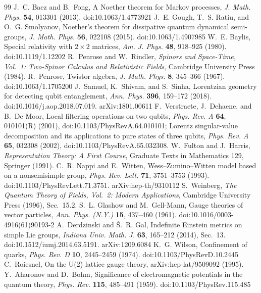 \documentclass[10pt]{article}
\begin{document}
\begin{thebibliography}{99}
 J.~C. Baez and B.~Fong, A Noether theorem for Markov processes, \textit{J. Math. Phys.} \textbf{54}, 013301 (2013). doi:10.1063/1.4773921
 J.~E. Gough, T.~S. Ratiu, and O.~G. Smolyanov, Noether's theorem for dissipative quantum dynamical semi-groups, \textit{J. Math. Phys.} \textbf{56}, 022108 (2015). doi:10.1063/1.4907985
 W.~E. Baylis, Special relativity with $2\times2$ matrices, \textit{Am. J. Phys.} \textbf{48}, 918--925 (1980). doi:10.1119/1.12202
 R.~Penrose and W.~Rindler, \textit{Spinors and Space-Time, Vol.~1: Two-Spinor Calculus and Relativistic Fields}, Cambridge University Press (1984).
 R.~Penrose, Twistor algebra, \textit{J. Math. Phys.} \textbf{8}, 345--366 (1967). doi:10.1063/1.1705200
 J.~Samuel, K.~Shivam, and S.~Sinha, Lorentzian geometry for detecting qubit entanglement, \textit{Ann. Phys.} \textbf{396}, 159--172 (2018). doi:10.1016/j.aop.2018.07.019. arXiv:1801.00611
 F.~Verstraete, J.~Dehaene, and B.~De Moor, Local filtering operations on two qubits, \textit{Phys. Rev. A} \textbf{64}, 010101(R) (2001), doi:10.1103/PhysRevA.64.010101; Lorentz singular-value decomposition and its applications to pure states of three qubits, \textit{Phys. Rev. A} \textbf{65}, 032308 (2002), doi:10.1103/PhysRevA.65.032308.
 W.~Fulton and J.~Harris, \textit{Representation Theory: A First Course}, Graduate Texts in Mathematics 129, Springer (1991).
 C.~R. Nappi and E.~Witten, Wess--Zumino--Witten model based on a nonsemisimple group, \textit{Phys. Rev. Lett.} \textbf{71}, 3751--3753 (1993). doi:10.1103/PhysRevLett.71.3751. arXiv:hep-th/9310112
 S.~Weinberg, \textit{The Quantum Theory of Fields, Vol.~2: Modern Applications}, Cambridge University Press (1996), Sec.~15.2.
 S.~L. Glashow and M.~Gell-Mann, Gauge theories of vector particles, \textit{Ann. Phys. (N.Y.)} \textbf{15}, 437--460 (1961). doi:10.1016/0003-4916(61)90193-2
 A.~Derdzinski and \'S.~R. Gal, Indefinite Einstein metrics on simple Lie groups, \textit{Indiana Univ. Math. J.} \textbf{63}, 165--212 (2014), Sec.~13. doi:10.1512/iumj.2014.63.5191. arXiv:1209.6084
 K.~G. Wilson, Confinement of quarks, \textit{Phys. Rev. D} \textbf{10}, 2445--2459 (1974). doi:10.1103/PhysRevD.10.2445
 C.~Roiesnel, On the U(2) lattice gauge theory, arXiv:hep-lat/9509092 (1995).
 Y.~Aharonov and D.~Bohm, Significance of electromagnetic potentials in the quantum theory, \textit{Phys. Rev.} \textbf{115}, 485--491 (1959). doi:10.1103/PhysRev.115.485

\end{thebibliography}
\end{document}
